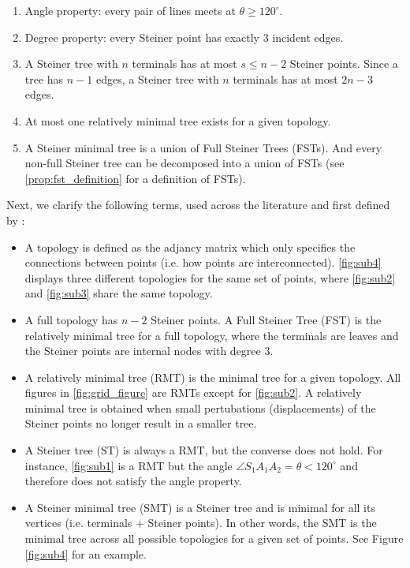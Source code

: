 \documentclass{l4proj}
\begin{document}
\begin{enumerate}
    \item Angle property: every pair of lines meets at $\theta \geq 120^\circ$.
    \item Degree property: every Steiner point has exactly 3 incident edges.
    \item \label{prop:esmt_fst} A Steiner tree with $n$ terminals has at most $s \leq n - 2$ Steiner points. Since a tree has $n - 1$ edges, a Steiner tree with $n$ terminals has at most $2n - 3$ edges.
    \item At most one relatively minimal tree exists for a given topology.
    \item \label{prop:smt_fst} A Steiner minimal tree is a union of Full Steiner Trees (FSTs). And every non-full Steiner tree can be decomposed into a union of FSTs (see \ref{prop:fst_definition} for a definition of FSTs).
\end{enumerate}

Next, we clarify the following terms, used across the literature and first defined by \cite{Gilbert1968SteinerMT}:
\begin{itemize}
    \item A topology is defined as the adjancy matrix which only specifies the connections between points (i.e. how points are interconnected). \ref{fig:sub4} displays three different topologies for the same set of points, where \ref{fig:sub2} and \ref{fig:sub3} share the same topology.
    \item \label{prop:fst_definition} A full topology has $n - 2$ Steiner points. A Full Steiner Tree (FST) is the relatively minimal tree for a full topology, where the terminals are leaves and the Steiner points are internal nodes with degree 3.
    \item A relatively minimal tree (RMT) is the minimal tree for a given topology. All figures in \ref{fig:grid_figure} are RMTs except for \ref{fig:sub2}. A relatively minimal tree is obtained when small pertubations (displacements) of the Steiner points no longer result in a smaller tree.
    \item  A Steiner tree (ST) is always a RMT, but the converse does not hold. For instance, \ref{fig:sub1} is a RMT but the angle $\angle S_1A_1A_2 = \theta < 120^\circ$ and therefore does not satisfy the angle property.
    \item A Steiner minimal tree (SMT) is a Steiner tree and is minimal for all its vertices (i.e. terminals + Steiner points). In other words, the SMT is the minimal tree across all possible topologies for a given set of points. See Figure \ref{fig:sub4} for an example.
\end{itemize}
\end{document}
